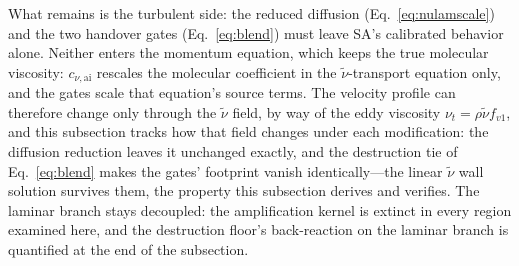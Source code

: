 \documentclass[journal]{new-aiaa}
\begin{document}
What remains is the turbulent side: the reduced diffusion
(Eq.~\eqref{eq:nulamscale}) and the two handover gates
(Eq.~\eqref{eq:blend}) must leave SA's calibrated behavior alone. Neither
enters the momentum equation, which keeps the true molecular viscosity:
$c_{\nu,\mathrm{ai}}$ rescales the molecular coefficient in the
$\tilde\nu$-transport equation only, and the gates scale that equation's
source terms. The velocity profile can therefore change only through the
$\tilde\nu$ field, by way of the eddy viscosity
$\nu_t\!=\!\rho\tilde\nu f_{v1}$, and this subsection tracks how that
field changes under each modification: the diffusion reduction leaves it
unchanged exactly, and the
destruction tie of Eq.~\eqref{eq:blend} makes the gates' footprint vanish
identically---the linear $\tilde\nu$ wall solution survives them, the
property this subsection derives and verifies. The laminar branch stays
decoupled: the amplification kernel is extinct in every region examined
here, and the destruction floor's back-reaction on the laminar branch is
quantified at the end of the subsection.
\end{document}
